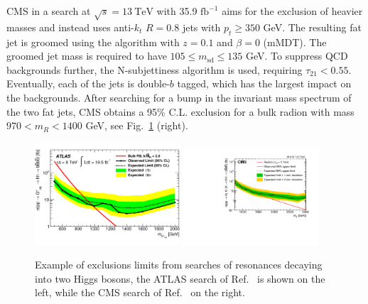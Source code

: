 CMS \cite{Sirunyan:2018qca} in a search at $\sqrt{s} = 13~\mathrm{TeV}$ with 35.9 $\mathrm{fb}^{-1}$ aims for the exclusion of heavier masses and instead uses anti-$k_t$ $R=0.8$ jets with $p_t \geq 350$ GeV. The resulting fat jet is groomed using the \SD algorithm with $z=0.1$ and $\beta=0$ (mMDT). The groomed jet mass is required to have $105 \leq m_{\mathrm{sd}} \leq 135$ GeV. To suppress QCD backgrounds further, the N-subjettiness algorithm is used, requiring $\tau_{21} < 0.55$. Eventually, each of the jets is double-$b$ tagged, which has the largest impact on the backgrounds. After searching for a bump in the invariant mass spectrum of the two fat jets, CMS obtains a 95\% C.L. exclusion for a bulk radion with mass $970 < m_R < 1400$ GeV, see Fig.~\ref{fig:X_HH} (right).

\begin{figure}
  \includegraphics[width=0.48\textwidth,trim=0 20 0 40]{figures/ATLAS_X_HH.pdf}\hfill
  \includegraphics[width=0.45\textwidth,trim=0 37 0 20]{figures/CMS_X_HH.pdf} 
  \caption{Example of exclusions limits from searches of resonances decaying into two Higgs bosons, the ATLAS search of Ref.~\cite{Aad:2015uka} is shown on the left, while the CMS search of Ref.~\cite{Sirunyan:2018qca} on the right. }\label{fig:X_HH}
\end{figure}

